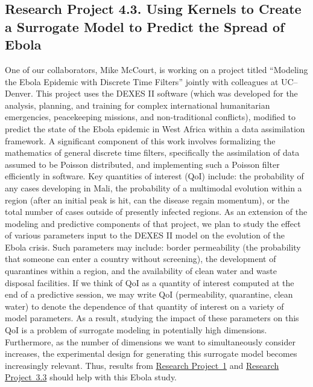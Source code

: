 \documentclass[11pt]{NSFamsart}
\newcommand{\refproba}{\hyperref[SectHSSVD]{Research Project~1}\xspace}
\newcommand{\refprobcc}{\hyperref[designsubsec]{Research Project~3.3}\xspace}
\begin{document}
\subsection*{Research Project 4.3. Using Kernels to Create a Surrogate Model to Predict the Spread of Ebola} \label{ebolasubsec}
One of our collaborators, Mike McCourt, is working on a project titled ``Modeling the Ebola Epidemic with Discrete Time Filters'' jointly with colleagues at UC--Denver. This project uses the DEXES II software (which was developed for the analysis, planning, and training for complex international humanitarian emergencies, peacekeeping missions, and non-traditional conflicts), modified to predict the state of the Ebola epidemic in West Africa within a data assimilation framework. A significant component of this work involves formalizing the mathematics of general discrete time filters, specifically the assimilation of data assumed to be Poisson distributed, and implementing such a Poisson filter efficiently in software. Key quantities of interest (QoI) include: the probability of any cases developing in Mali, the probability of a multimodal evolution within a region (after an initial peak is hit, can the disease regain momentum), or the total number of cases outside of presently infected regions.
As an extension of the modeling and predictive components of that project, we plan to study the effect of various parameters input to the DEXES II model on the evolution of the Ebola crisis.  Such parameters may include: border permeability (the probability that someone can enter a country without screening), the development of quarantines within a region, and the availability of clean water and waste disposal facilities.  If we think of QoI as a quantity of interest computed at the end of a predictive session, we may write QoI (permeability, quarantine, clean water) to denote the dependence of that quantity of interest on a variety of model parameters.  As a result, studying the impact of these parameters on this QoI is a problem of surrogate modeling in potentially high dimensions.  Furthermore, as the number of dimensions we want to simultaneously consider increases, the experimental design for generating this surrogate model becomes increasingly relevant.  Thus, results from \refproba and \refprobcc should help with this Ebola study.
\end{document}
